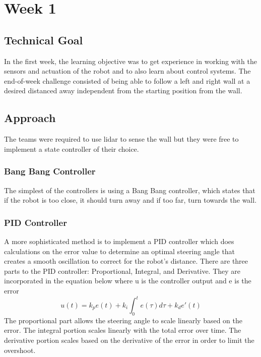\documentclass[journal, a4paper]{IEEEtran}
\begin{document}
\section{Week 1}
\subsection{Technical Goal}
In the first week, the learning objective was to get experience in working with the sensors and actuation of the robot and to also learn about control systems. The end-of-week challenge consisted of being able to follow a left and right wall at a desired distanced away independent from the starting position from the wall. 
\subsection{Approach}
The teams were required to use lidar to sense the wall but they were free to implement a state controller of their choice.
\subsubsection{Bang Bang Controller}The simplest of the controllers is using a Bang Bang controller, which states that if the robot is too close, it should turn away and if too far, turn towards the wall. 
\subsubsection{PID Controller}A more sophisticated method is to implement a PID controller which does calculations on the error value to determine an optimal steering angle that creates a smooth oscillation to correct for the robot’s distance. There are three parts to the PID controller: Proportional, Integral, and Derivative. They are incorporated in the equation below where u is the controller output and e is the error
\begin{equation}
u(t) = k_{p}e(t)+k_i\int_{0}^{t}e(\tau)d\tau + k_{d}e'(t)
\end{equation}
The proportional part allows the steering angle to scale linearly based on the error. The integral portion scales linearly with the total error over time. The derivative portion scales based on the derivative of the error in order to limit the overshoot. \cite{pid-mit}
\end{document}
